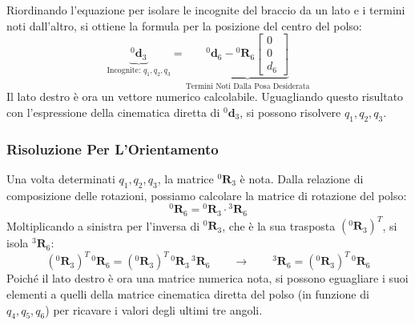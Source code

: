 \documentclass[11pt, a4paper]{report}
\begin{document}
Riordinando l'equazione per isolare le incognite del braccio da un lato e i termini noti dall'altro, si ottiene la formula per la posizione del centro del polso:
\[
    \underbrace{{}^{0}\mathbf{d}_{3}}_{\text{Incognite: } q_1, q_2, q_3} = \underbrace{{}^{0}\mathbf{d}_{6} - {}^0\mathbf{R}_6 \begin{bmatrix} 0 \\ 0 \\ d_6 \end{bmatrix}}_{\text{Termini Noti Dalla Posa Desiderata}}
\]
Il lato destro è ora un vettore numerico calcolabile. Uguagliando questo risultato con l'espressione della cinematica diretta di \({}^{0}\mathbf{d}_{3}\), si possono risolvere $q_1, q_2, q_3$.
\newpage
\subsubsection*{Risoluzione Per L'Orientamento}
Una volta determinati $q_1, q_2, q_3$, la matrice ${}^0\mathbf{R}_3$ è nota. Dalla relazione di composizione delle rotazioni, possiamo calcolare la matrice di rotazione del polso:
\[
    {}^0\mathbf{R}_6 = {}^0\mathbf{R}_3 \cdot {}^3\mathbf{R}_6
\]
Moltiplicando a sinistra per l'inversa di ${}^0\mathbf{R}_3$, che è la sua trasposta $({}^0\mathbf{R}_3)^{T}$, si isola ${}^3\mathbf{R}_6$:
\[
    ({}^0\mathbf{R}_3)^{T} \, {}^0\mathbf{R}_6 = ({}^0\mathbf{R}_3)^{T} \, {}^0\mathbf{R}_3 \, {}^3\mathbf{R}_6
    \qquad\longrightarrow\qquad
    {}^3\mathbf{R}_6 = ({}^0\mathbf{R}_3)^{T} \, {}^0\mathbf{R}_6
\]
Poiché il lato destro è ora una matrice numerica nota, si possono eguagliare i suoi elementi a quelli della matrice cinematica diretta del polso (in funzione di $q_4, q_5, q_6$) per ricavare i valori degli ultimi tre angoli.
\end{document}

